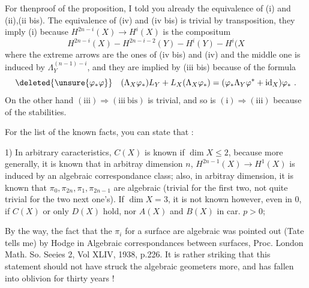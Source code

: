 For thenproof of the proposition, I told you already the equivalence of (i) and (ii),(ii bis). The equivalence of (iv) and (iv bis) is trivial by transposition, they  imply (i) because $H^{2n-i}(X)\to H^i(X)$ is the compositum
\[
H^{2n-i}(X)\mathbin{-}H^{2n-i-2}(Y)\mathbin{-}H^i(Y)\mathbin{-}H^i(X
\]
where the extreme arrows are the ones of (iv bis) and (iv) and the middle one is induced by $\Lambda_Y^{(n-1)-i}$, and they are implied by (iii bis) because of the formula
\[
\deleted{\unsure{\varphi_*\varphi}}\quad(\Lambda_X\varphi_*)L_Y+L_X(\Lambda_X\varphi_*)=(\varphi_*\Lambda_Y\varphi^*+\operatorname{id}_X)\varphi_*\ .
\]
On the other hand $(\mathrm{iii})\Rightarrow(\mathrm{iii\ bis})$ is trivial, and so is $(\mathrm{i})\Longrightarrow(\mathrm{iii})$ because of the stabilities.

For the list of the known facts, you can state that :

1) In arbitrary caracteristics, $C(X)$ is known if $\dim X\leq2$, because more generally, it is known that in arbitray dimension $n$, $H^{2n-1}(X)\to H^1(X)$ is induced by an algebraic correspondance class; also, in arbitray dimension, it is known that $\pi_0,\pi_{2n},\pi_1,\pi_{2n-1}$ are algebraic (trivial for the first two, not quite trivial for the two next one's). If $\dim X=3$, it is not known however, even in  $0$, if $C(X)$ or only $D(X)$ hold, nor $A(X)$ and $B(X)$ in car. $p>0$;



By the way, the fact that the $\pi_i$ for a surface are algebraic was pointed out (Tate tells me) by Hodge in Algebraic correspondances between surfaces, Proc. London Math. So. Seeies 2, Vol XLIV, 1938, p.226. It is rather striking that this statement should not have struck the algebraic geometers more, and has fallen into oblivion for  thirty years !


